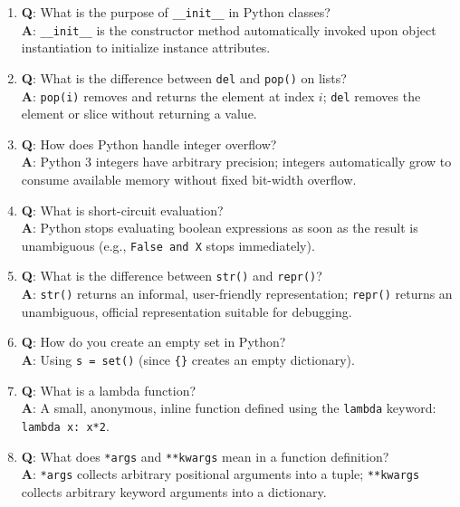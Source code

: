 \begin{enumerate}[leftmargin=1.5em]
    \item \textbf{Q}: What is the purpose of \texttt{\_\_init\_\_} in Python classes?\\
    \textbf{A}: \texttt{\_\_init\_\_} is the constructor method automatically invoked upon object instantiation to initialize instance attributes.

    \item \textbf{Q}: What is the difference between \texttt{del} and \texttt{pop()} on lists?\\
    \textbf{A}: \texttt{pop(i)} removes and returns the element at index $i$; \texttt{del} removes the element or slice without returning a value.

    \item \textbf{Q}: How does Python handle integer overflow?\\
    \textbf{A}: Python 3 integers have arbitrary precision; integers automatically grow to consume available memory without fixed bit-width overflow.

    \item \textbf{Q}: What is short-circuit evaluation?\\
    \textbf{A}: Python stops evaluating boolean expressions as soon as the result is unambiguous (e.g., \texttt{False and X} stops immediately).

    \item \textbf{Q}: What is the difference between \texttt{str()} and \texttt{repr()}?\\
    \textbf{A}: \texttt{str()} returns an informal, user-friendly representation; \texttt{repr()} returns an unambiguous, official representation suitable for debugging.

    \item \textbf{Q}: How do you create an empty set in Python?\\
    \textbf{A}: Using \texttt{s = set()} (since \texttt{\{\}} creates an empty dictionary).

    \item \textbf{Q}: What is a lambda function?\\
    \textbf{A}: A small, anonymous, inline function defined using the \texttt{lambda} keyword: \texttt{lambda x: x*2}.

    \item \textbf{Q}: What does \texttt{*args} and \texttt{**kwargs} mean in a function definition?\\
    \textbf{A}: \texttt{*args} collects arbitrary positional arguments into a tuple; \texttt{**kwargs} collects arbitrary keyword arguments into a dictionary.


\end{enumerate}
